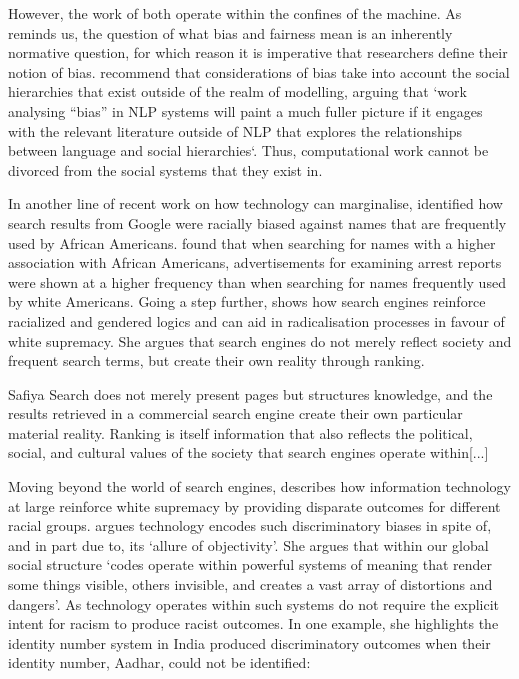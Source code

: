 However, the work of \citet{Kearns:2018,Foulds:2019} both operate within the confines of the machine. As \citet{Blodgett:2020} reminds us, the question of what bias and fairness mean is an inherently normative question, for which reason it is imperative that researchers define their notion of bias.
\citet{Blodgett:2020} recommend that considerations of bias take into account the social hierarchies that exist outside of the realm of modelling, arguing that `work analysing ``bias'' in NLP systems will paint a much fuller picture if it engages with the relevant literature outside of NLP that explores the relationships between language and social hierarchies`.
Thus, computational work cannot be divorced from the social systems that they exist in.

In another line of recent work on how technology can marginalise, \citet{Sweeney:2013} identified how search results from Google were racially biased against names that are frequently used by African Americans.
\citet{Sweeney:2013} found that when searching for names with a higher association with African Americans, advertisements for examining arrest reports were shown at a higher frequency than when searching for names frequently used by white Americans.
Going a step further, \citet{Noble:2018} shows how search engines reinforce racialized and gendered logics and can aid in radicalisation processes in favour of white supremacy.
She argues that search engines do not merely reflect society and frequent search terms, but create their own reality through ranking.

\begin{citequote}{Safiya \citet[p.148]{Noble:2018}}
  Search does not merely present pages but structures knowledge, and the results retrieved in a commercial search engine create their own particular material reality. Ranking is itself information that also reflects the political, social, and cultural values of the society that search engines operate within[...]
\end{citequote}

Moving beyond the world of search engines, \citet{Benjamin:2019} describes how information technology at large reinforce white supremacy by providing disparate outcomes for different racial groups.
\citet{Benjamin:2019} argues technology encodes such discriminatory biases in spite of, and in part due to, its `allure of objectivity'.
She argues that within our global social structure `codes operate within powerful systems of meaning that render some things visible, others invisible, and creates a vast array of distortions and dangers'.
As technology operates within such systems do not require the explicit intent for racism to produce racist outcomes.
In one example, she highlights the identity number system in India produced discriminatory outcomes when their identity number, Aadhar, could not be identified:

